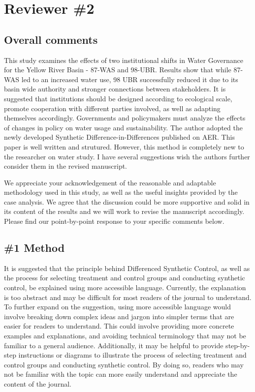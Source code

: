 \section{Reviewer \#2}\label{reviewer_2}

\subsection*{Overall comments}

\RC{} This study examines the effects of two institutional shifts in Water Governance for the Yellow River Basin - 87-WAS and 98-UBR. Results show that while 87-WAS led to an increased water use, 98 UBR successfully reduced it due to its basin wide authority and stronger connections between stakeholders. It is suggested that institutions should be designed according to ecological scale, promote cooperation with different parties involved, as well as adapting themselves accordingly. Governments and policymakers must analyze the effects of changes in policy on water usage and sustainability. The author adopted the newly developed Synthetic Difference-in-Differences published on AER. This paper is well written and strutured. However, this method is completely new to the researcher on water study. I have several suggestions wish the authors further consider them in the revised manuscript.

\AR{} We appreciate your acknowledgement of the reasonable and adaptable methodology used in this study, as well as the useful insights provided by the case analysis. We agree that the discussion could be more supportive and solid in its content of the results and we will work to revise the manuscript accordingly. Please find our point-by-point response to your specific comments below.

\subsection{\#1 Method}

\RC{}  It is suggested that the principle behind Differenced Synthetic Control, as well as the process for selecting treatment and control groups and conducting synthetic control, be explained using more accessible language. Currently, the explanation is too abstract and may be difficult for most readers of the journal to understand. To further expand on the suggestion, using more accessible language would involve breaking down complex ideas and jargon into simpler terms that are easier for readers to understand. This could involve providing more concrete examples and explanations, and avoiding technical terminology that may not be familiar to a general audience. Additionally, it may be helpful to provide step-by-step instructions or diagrams to illustrate the process of selecting treatment and control groups and conducting synthetic control. By doing so, readers who may not be familiar with the topic can more easily understand and appreciate the content of the journal.

